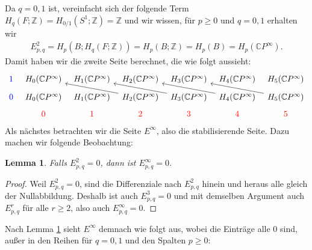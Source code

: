 \documentclass[12pt]{article}
\numberwithin{conj}{section}
\newtheorem{lemma}[conj]{Lemma}
\begin{document}
                    Da $q=0,1$ ist, vereinfacht sich der folgende Term $H_q(F;\mathbb{Z}) = H_{0/1}(S^1;\mathbb{Z}) = \mathbb{Z}$ und wir wissen, für $p \geq 0$ und $q = 0,1$ erhalten wir
                    \begin{align}
                        E^2_{p,q} = H_p(B; H_q(F;\mathbb{Z})) = H_p(B;\mathbb{Z}) = H_p(B) = H_p(\mathbb{C}P^\infty).
                    \end{align}
                    Damit haben wir die zweite Seite berechnet, die wie folgt aussieht:
                    \[\begin{tikzcd}[sep=tiny]
                        {\color{blue}1} & {H_0(\mathbb{C}P^\infty)} & {H_1(\mathbb{C}P^\infty)} & {H_2(\mathbb{C}P^\infty)} & {H_3(\mathbb{C}P^\infty)} & {H_4(\mathbb{C}P^\infty)} & {H_5(\mathbb{C}P^\infty)} \\
                        {\color{blue}0} & {H_0(\mathbb{C}P^\infty)} & {H_1(\mathbb{C}P^\infty)} & {H_2(\mathbb{C}P^\infty)} & {H_3(\mathbb{C}P^\infty)} & {H_4(\mathbb{C}P^\infty)} & {H_5(\mathbb{C}P^\infty)} \\
                        & {\color{red}0} & {\color{red}1} & {\color{red}2} & {\color{red}3} & {\color{red}4} & {\color{red}5}
                        \arrow[from=2-4, to=1-2]
                        \arrow[from=2-5, to=1-3]
                        \arrow[from=2-6, to=1-4]
                        \arrow[from=2-7, to=1-5]
                    \end{tikzcd}\]
                    Als nächstes betrachten wir die Seite $E^\infty$, also die stabilisierende Seite. Dazu machen wir folgende Beobachtung:
                    \begin{lemma}
                        \label{lemma:infinitysection}
                        Falls $E^2_{p,q} = 0$, dann ist $E^\infty_{p,q} = 0$.
                    \end{lemma}
                    \begin{proof}
                    Weil $E^2_{p,q} = 0$, sind die Differenziale nach $E^2_{p,q}$ hinein und heraus alle gleich der Nullabbildung. Deshalb ist auch $E^3_{p,q} = 0$ und mit demselben Argument auch $E^r_{p,q}$ für alle $r \geq 2$, also auch $E^\infty_{p,q} = 0$.
                    \end{proof}

                    Nach Lemma \ref{lemma:infinitysection} sieht $E^\infty$ demnach wie folgt aus, wobei die Einträge alle $0$ sind, außer in den Reihen für $q = 0,1$ und den Spalten $p \geq 0$:

                    \nocite{*}
                    \printbibliography
\end{document}
